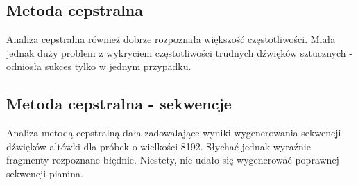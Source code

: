 \documentclass{classrep}
\begin{document}
\subsection{Metoda cepstralna}
Analiza cepstralna również dobrze rozpoznała większość częstotliwości. Miała jednak duży problem z wykryciem częstotliwości trudnych dźwięków sztucznych - odniosła sukces tylko w jednym przypadku. 

\subsection{Metoda cepstralna - sekwencje}
Analiza metodą cepstralną dała zadowalające wyniki wygenerowania sekwencji dźwięków altówki dla próbek o wielkości 8192. Słychać jednak wyraźnie fragmenty rozpoznane błędnie. Niestety, nie udało się wygenerować poprawnej sekwencji pianina.  

\begin{thebibliography}{1}
\\
\\
\\
\end{thebibliography}
\end{document}
